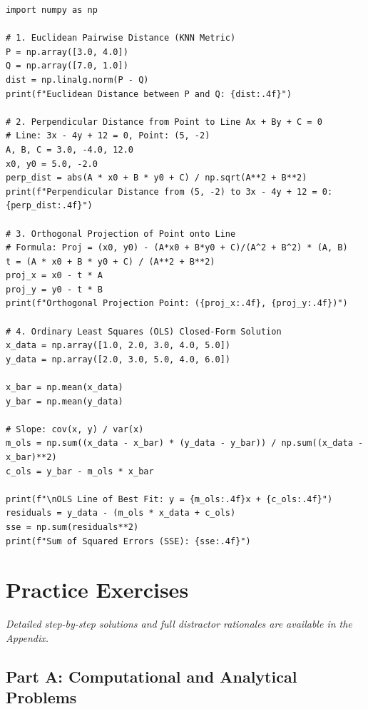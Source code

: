 \begin{lstlisting}[caption={Analytical Geometry and Linear Regression in Python}]
import numpy as np

# 1. Euclidean Pairwise Distance (KNN Metric)
P = np.array([3.0, 4.0])
Q = np.array([7.0, 1.0])
dist = np.linalg.norm(P - Q)
print(f"Euclidean Distance between P and Q: {dist:.4f}")

# 2. Perpendicular Distance from Point to Line Ax + By + C = 0
# Line: 3x - 4y + 12 = 0, Point: (5, -2)
A, B, C = 3.0, -4.0, 12.0
x0, y0 = 5.0, -2.0
perp_dist = abs(A * x0 + B * y0 + C) / np.sqrt(A**2 + B**2)
print(f"Perpendicular Distance from (5, -2) to 3x - 4y + 12 = 0: {perp_dist:.4f}")

# 3. Orthogonal Projection of Point onto Line
# Formula: Proj = (x0, y0) - (A*x0 + B*y0 + C)/(A^2 + B^2) * (A, B)
t = (A * x0 + B * y0 + C) / (A**2 + B**2)
proj_x = x0 - t * A
proj_y = y0 - t * B
print(f"Orthogonal Projection Point: ({proj_x:.4f}, {proj_y:.4f})")

# 4. Ordinary Least Squares (OLS) Closed-Form Solution
x_data = np.array([1.0, 2.0, 3.0, 4.0, 5.0])
y_data = np.array([2.0, 3.0, 5.0, 4.0, 6.0])

x_bar = np.mean(x_data)
y_bar = np.mean(y_data)

# Slope: cov(x, y) / var(x)
m_ols = np.sum((x_data - x_bar) * (y_data - y_bar)) / np.sum((x_data - x_bar)**2)
c_ols = y_bar - m_ols * x_bar

print(f"\nOLS Line of Best Fit: y = {m_ols:.4f}x + {c_ols:.4f}")
residuals = y_data - (m_ols * x_data + c_ols)
sse = np.sum(residuals**2)
print(f"Sum of Squared Errors (SSE): {sse:.4f}")
\end{lstlisting}

\newpage
\section{Practice Exercises}
\textit{Detailed step-by-step solutions and full distractor rationales are available in the Appendix.}

\subsection*{Part A: Computational and Analytical Problems}

